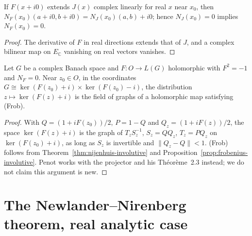 \begin{proposition}
  \label{prop:nijenhuis-complexified}
  \leanok
  If $F(x + i0)$ extends $J(x)$ complex linearly for real $x$ near $x_0$, then
  $N_F(x_0)(a + i0, b + i0) = N_J(x_0)(a, b) + i0$; hence $N_J(x_0) = 0$ implies $N_F(x_0) = 0$.
\end{proposition}

\begin{proof}
  \leanok
  The derivative of $F$ in real directions extends that of $J$, and a complex bilinear map on
  $E_{\mathbb{C}}$ vanishing on real vectors vanishes.
\end{proof}

\begin{theorem}
  \label{thm:nijenhuis-graph}
  \leanok
  Let $G$ be a complex Banach space and $F \colon O \to L(G)$ holomorphic with $F^2 = -1$ and
  $N_F = 0$. Near $z_0 \in O$, in the coordinates $G \cong \ker(F(z_0) + i) \times
  \ker(F(z_0) - i)$, the distribution $z \mapsto \ker(F(z) + i)$ is the field of graphs of a
  holomorphic map satisfying (Frob).
\end{theorem}

\begin{proof}
  \leanok
  With $Q = (1 + iF(z_0))/2$, $P = 1 - Q$ and $Q_z = (1 + iF(z))/2$, the space $\ker(F(z) + i)$
  is the graph of $T_z S_z^{-1}$, $S_z = Q Q_z$, $T_z = P Q_z$ on $\ker(F(z_0) + i)$, as long as
  $S_z$ is invertible and $\|Q_z - Q\| < 1$. (Frob) follows from
  Theorem~\ref{thm:nijenhuis-involutive} and Proposition~\ref{prop:frobenius-involutive}. Penot
  works with the projector and his Théorème~2.3 instead; we do not claim this argument is new.
\end{proof}

\section{The Newlander--Nirenberg theorem, real analytic case}

